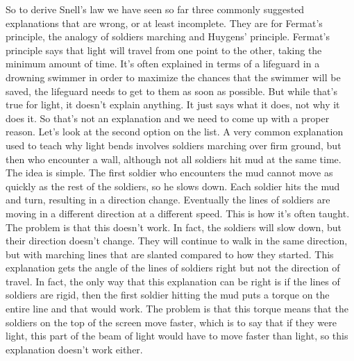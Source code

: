 	So to derive Snell's law we have seen so far three commonly suggested explanations that are wrong, or at least incomplete. They are for Fermat's principle, the analogy of soldiers marching and Huygens' principle. Fermat's principle says that light will travel from one point to the other, taking the minimum amount of time. It's often explained in terms of a lifeguard in a drowning swimmer in order to maximize the chances that the swimmer will be saved, the lifeguard needs to get to them as soon as possible. But while that's true for light, it doesn't explain anything. It just says what it does, not why it does it. So that's not an explanation and we need to come up with a proper reason. Let's look at the second option on the list. A very common explanation used to teach why light bends involves soldiers marching over firm ground, but then who encounter a wall, although not all soldiers hit mud at the same time. The idea is simple. The first soldier who encounters the mud cannot move as quickly as the rest of the soldiers, so he slows down. Each soldier hits the mud and turn, resulting in a direction change. Eventually the lines of soldiers are moving in a different direction at a different speed. This is how it's often taught. The problem is that this doesn't work. In fact, the soldiers will slow down, but their direction doesn't change. They will continue to walk in the same direction, but with marching lines that are slanted compared to how they started. This explanation gets the angle of the lines of soldiers right but not the direction of travel. In fact, the only way that this explanation can be right is if the lines of soldiers are rigid, then the first soldier hitting the mud puts a torque on the entire line and that would work. The problem is that this torque means that the soldiers on the top of the screen move faster, which is to say that if they were light, this part of the beam of light would have to move faster than light, so this explanation doesn't work either.

